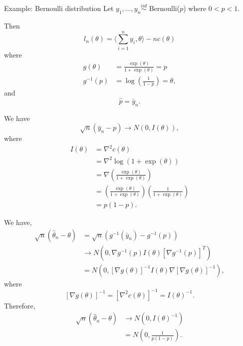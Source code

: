 \documentclass[
  ignorenonframetext,
]{beamer}
\begin{document}
\begin{frame}{Example: Bernoulli distribution}
\protect\hypertarget{example-bernoulli-distribution}{}
Let \(y_1,\ldots,y_n \overset{iid}{\sim}\) Bernoulli(\(p\)) where
\(0 < p < 1\).

Then \[
  l_n(\theta) = \langle\sum_{i=1}^n y_i,\theta\rangle - n c(\theta)
\] where \begin{align*}
  g(\theta) &= \frac{\exp(\theta)}{1 + \exp(\theta)} = p \\
  g^{-1}(p) &= \log\left(\frac{1}{1-p}\right) = \theta,
\end{align*} and \[
  \hat{p} = \bar{y}_n.
\]
\end{frame}

\begin{frame}{}
\protect\hypertarget{section-6}{}
We have \[
  \sqrt{n}\left(\bar{y}_n - p\right) \to N\left(0, I(\theta)\right),
\] where \begin{align*}
  I(\theta) &= \nabla^2 c(\theta) \\
    &= \nabla^2 \log(1 + \exp(\theta)) \\ 
    &= \nabla\left(\frac{\exp(\theta)}{1 + \exp(\theta)}\right) \\
    &= \left(\frac{\exp(\theta)}{1 + \exp(\theta)}\right)\left(\frac{1}{1 + \exp(\theta)}\right) \\
    &= p(1-p).
\end{align*}
\end{frame}

\begin{frame}{}
\protect\hypertarget{section-7}{}
We have, \begin{align*}
  \sqrt{n}\left(\hat{\theta}_n - \theta\right) &= \sqrt{n}\left(g^{-1}(\bar{y}_n) - g^{-1}(p)\right) \\ 
    &\to N\left(0,  \nabla g^{-1}(p) I(\theta) \left[\nabla g^{-1}(p)\right]^T\right) \\
    &= N\left(0,  \left[\nabla g(\theta)\right]^{-1} I(\theta) \nabla \left[\nabla g(\theta)\right]^{-1}\right), 
\end{align*} where \[
  [\nabla g(\theta)]^{-1} = [\nabla^2 c(\theta)]^{-1} = I(\theta)^{-1}.
\] Therefore, \begin{align*}
 \sqrt{n}\left(\hat{\theta}_n - \theta\right) &\to N\left(0,  I(\theta)^{-1}\right) \\
   &= N\left(0,  \frac{1}{p(1-p)}\right).
\end{align*}
\end{frame}
\end{document}
